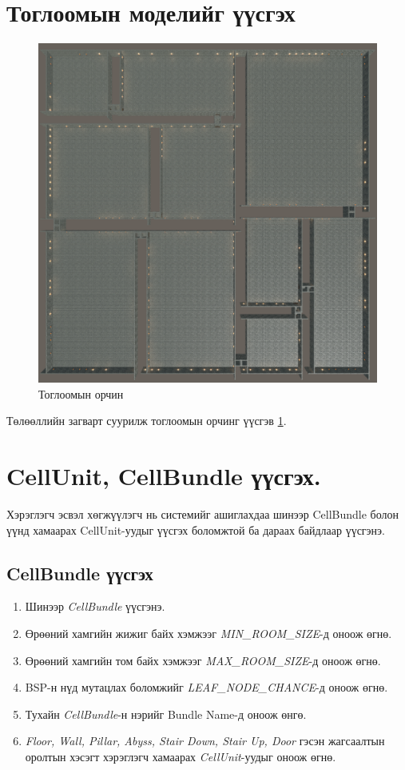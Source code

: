 \section{Тоглоомын моделийг үүсгэх}
\begin{figure}[ht]
	\centering
	\includegraphics[width=\textwidth-2cm]{./images/Procedural Dungeon.png}
	\caption{Тоглоомын орчин}
	\label{fig:ProceduralDungeon}
\end{figure}
Төлөөллийн загварт суурилж тоглоомын орчинг үүсгэв \ref{fig:ProceduralDungeon}.

\section{CellUnit, CellBundle үүсгэх.}
Хэрэглэгч эсвэл хөгжүүлэгч нь системийг ашиглахдаа шинээр CellBundle болон үүнд хамаарах CellUnit-уудыг үүсгэх боломжтой ба дараах байдлаар үүсгэнэ.

\subsection{CellBundle үүсгэх}
\begin{enumerate}
	\item Шинээр \textit{CellBundle} үүсгэнэ.
	\item Өрөөний хамгийн жижиг байх хэмжээг \textit{MIN\_ROOM\_SIZE}-д оноож өгнө.
	\item Өрөөний хамгийн том байх хэмжээг \textit{MAX\_ROOM\_SIZE}-д оноож өгнө.
	\item BSP-н нүд мутацлах боломжийг \textit{LEAF\_NODE\_CHANCE}-д оноож өгнө.
	\item Тухайн \textit{CellBundle}-н нэрийг Bundle Name-д оноож өнгө.
	\item \textit{Floor, Wall, Pillar, Abyss, Stair Down, Stair Up, Door} гэсэн жагсаалтын оролтын хэсэгт хэрэглэгч хамаарах \textit{CellUnit}-уудыг оноож өгнө.
\end{enumerate}

